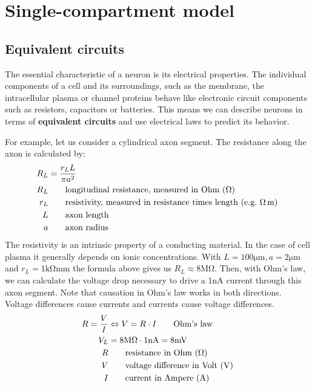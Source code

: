\chapter{Single-compartment model}

\section{Equivalent circuits}

The essential characteristic of a neuron is its electrical properties. The individual components of a cell and its surroundings, such as the membrane, the intracellular plasma or channel proteins behave like electronic circuit components such as resistors, capacitors or batteries. This means we can describe neurons in terms of \textbf{equivalent circuits} and use electrical laws to predict its behavior.

For example, let us consider a cylindrical axon segment. The resistance along the axon is calculated by:
\begin{align*}
R_L &= \frac{r_LL}{\pi a^2} \\
R_L &\qquad \text{longitudinal resistance, measured in Ohm (\si{\ohm})} \\
r_L &\qquad \text{resistivity, measured in resistance times length (e.g.\ \si{\ohm\meter})}\\
L &\qquad \text{axon length}\\
a &\qquad \text{axon radius}
\end{align*}
The resistivity is an intrinsic property of a conducting material. In the case of cell plasma it generally depends on ionic concentrations. With $L=100\si{\micro\meter}, a=2\si{\micro\meter}$ and $r_L=1\si{\kilo\ohm\milli\meter}$ the formula above gives us $R_L\approx 8 \si{\mega\ohm}$. Then, with Ohm's law, we can calculate the voltage drop necessary to drive a 1\si{\nano\ampere} current through this axon segment. Note that causation in Ohm's law works in both directions. Voltage differences cause currents and currents cause voltage differences.
\begin{align*}
R=\frac{V}{I} &\Leftrightarrow V=R\cdot I \qquad \text{Ohm's law}\\
V_L &= 8\si{\mega\ohm}\cdot 1\si{\nano\ampere} = 8\si{mV}\\
R &\qquad \text{resistance in Ohm (\si{\ohm})} \\
V &\qquad \text{voltage difference in Volt (\si{\volt})}\\
I &\qquad \text{current in Ampere (\si{\ampere})}
\end{align*}


